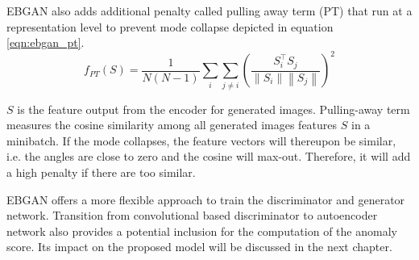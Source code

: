 EBGAN also adds additional penalty called pulling away term (PT) that run at a
representation level to prevent mode collapse depicted in equation \ref{eqn:ebgan_pt}.
\begin{equation}
\label{eqn:ebgan_pt}
	f_{P T}(S)=\frac{1}{N(N-1)} \sum_{i} \sum_{j \neq i}\left(\frac{S_{i}^{\top} S_{j}}{\left\|S_{i}\right\|\left\|S_{j}\right\|}\right)^{2}
\end{equation}

 $S$ is the feature output from the encoder for generated images. Pulling-away term measures the
 cosine similarity among all generated images features $S$ in a minibatch. If the mode collapses,
 the feature vectors will thereupon be similar, i.e. the angles are close to zero and the cosine
 will max-out. Therefore, it will add a high penalty if there are too similar.
 \cite{Zhao2016EnergybasedGA}
 
 EBGAN offers a more flexible approach to train the discriminator and generator network. 
 Transition from convolutional based discriminator to autoencoder network also provides a potential inclusion 
 for the computation of the anomaly score. Its impact on the proposed model will be discussed in the next chapter. 

\endgroup
